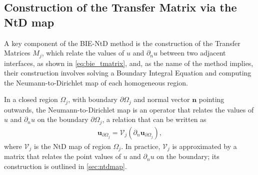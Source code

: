 \documentclass[reprint,amsmath,amssymb,
 aps]{revtex4-2}
\newcommand{\bol}{\boldsymbol}
\newcommand{\lf}{\left}
\newcommand{\rg}{\right}
\newcommand{\Vcal}{\mathcal{V}}
\begin{document}
\subsection{Construction of the Transfer Matrix via the NtD map}\label{sec:tmatrix}
A key component of the BIE-NtD method is the construction of the Transfer Matrices $M_j$, which relate the values of $u$ and $\partial_n u$ between two adjacent interfaces, as shown in \cref{eq:bie_tmatrix}, and, as the name of the method implies, their construction involves solving a Boundary Integral Equation and computing the Neumann-to-Dirichlet map of each homogeneous region.

In a closed region $\Omega_j$, with boundary $\partial\Omega_j$ and normal vector $\bol n$ pointing outwards, the Neumann-to-Dirichlet map is an operator that relates the values of $u$ and $\partial_n u$ on the boundary $\partial\Omega_j$, a relation that can be written as 
\begin{align}
    \bol u_{\partial\Omega_j} = \Vcal_j \lf(\partial_n \bol u_{\partial\Omega_j}\rg), \label{eq:ntd1}
\end{align}
where $\Vcal_j$ is the NtD map of region $\Omega_j$. In practice, $\Vcal_j$ is approximated by a matrix that relates the point values of $u$ and $\partial_n u$ on the boundary; its construction is outlined in \cref{sec:ntdmap}. 
\end{document}
